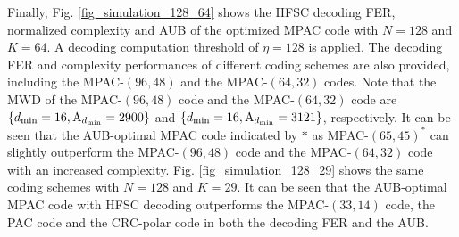 \documentclass[12pt, draftclsnofoot, peerreview, onecolumn]{IEEEtran}
\theoremstyle{noparent}
\begin{document}
Finally, Fig. \ref{fig_simulation_128_64} shows the HFSC decoding FER, normalized complexity and AUB of 
the optimized MPAC code with $N=128$ and $K=64$. 
A decoding computation threshold of $\eta=128$ is applied. 
The decoding FER and complexity performances of different coding schemes are also provided,
including the MPAC-$(96,48)$ and the MPAC-$(64,32)$ codes.
Note that the MWD of the MPAC-$(96,48)$ code and the MPAC-$(64,32)$ code are 
$\{d_{\min}=16, {\rm A}_{d_{\min}}=2900\}$ and 
$\{d_{\min}=16, {\rm A}_{d_{\min}}=3121\}$, respectively. 
It can be seen that the AUB-optimal MPAC code indicated by $*$ as MPAC-$(65,45)^*$ can slightly outperform 
the MPAC-$(96,48)$ code and the MPAC-$(64,32)$ code with an increased complexity.
Fig. \ref{fig_simulation_128_29} shows the same coding schemes with $N=128$ and $K=29$.
It can be seen that the AUB-optimal MPAC code with HFSC decoding
outperforms the MPAC-$(33,14)$ code, the PAC code and the CRC-polar code
in both the decoding FER and the AUB.















    
\end{document}
